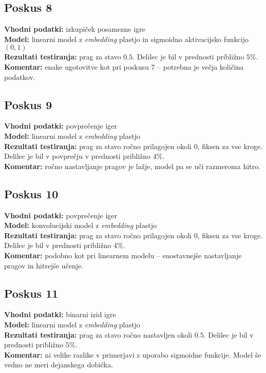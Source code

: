 \documentclass[a4paper,12pt]{article}
\begin{document}
\subsection{Poskus 8}
\textbf{Vhodni podatki:} izkupiček posamezne igre \\
\textbf{Model:} linearni model z \textit{embedding} plastjo in sigmoidno aktivacijsko funkcijo $(0,1)$ \\
\textbf{Rezultati testiranja:} prag za stavo $0.5$. Delilec je bil v prednosti približno $5\%$. \\
\textbf{Komentar:} enake ugotovitve kot pri poskusu 7 – potrebna je večja količina podatkov.

\subsection{Poskus 9}
\textbf{Vhodni podatki:} povprečenje iger \\
\textbf{Model:} linearni model z \textit{embedding} plastjo \\
\textbf{Rezultati testiranja:} prag za stavo ročno prilagojen okoli $0$, fiksen za vse kroge. Delilec je bil v povprečju v prednosti približno $4\%$. \\
\textbf{Komentar:} ročno nastavljanje pragov je lažje, model pa se uči razmeroma hitro.

\subsection{Poskus 10}
\textbf{Vhodni podatki:} povprečenje iger \\
\textbf{Model:} konvolucijski model z \textit{embedding} plastjo \\
\textbf{Rezultati testiranja:} prag za stavo ročno prilagojen okoli $0$, fiksen za vse kroge. Delilec je bil v prednosti približno $4\%$. \\
\textbf{Komentar:} podobno kot pri linearnem modelu – enostavnejše nastavljanje pragov in hitrejše učenje.

\subsection{Poskus 11}
\textbf{Vhodni podatki:} binarni izid igre \\
\textbf{Model:} linearni model z \textit{embedding} plastjo \\
\textbf{Rezultati testiranja:} prag za stavo ročno nastavljen okoli $0.5$. Delilec je bil v prednosti približno $5\%$. \\
\textbf{Komentar:} ni velike razlike v primerjavi z uporabo sigmoidne funkcije. Model še vedno ne meri dejanskega dobička.
\end{document}
